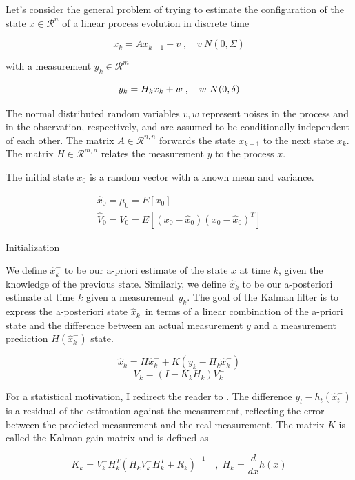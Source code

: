 \documentclass[mscthesis]{usiinfthesis}
\begin{document}
Let's consider the general problem of trying to estimate the configuration of the state $x \in \mathcal{R}^n$ of a linear process evolution in discrete time

\[
x_k = A x_{k-1} + v \; , \quad v ~ N(0, \Sigma)
\]

with a measurement $y_k \in \mathcal{R}^m$ 

\[
y_k = H_k x_k + w \; , \quad w  ~ N(0, \delta) \\
\]

The normal distributed random variables $v, w$ represent noises in the process and in the observation, respectively, and are assumed to be conditionally independent of each other. The matrix $A \in \mathcal{R}^{n, n}$ forwards the state $x_{k-1}$ to the next state $x_k$. The matrix $H \in \mathcal{R}^{m,n}$ relates the measurement $y$ to the process $x$.

The initial state $x_0$ is a random vector with a known mean and variance.

\begin{eqfloat}
\begin{equation}
\begin{array}{l}
\hat{x}_0 = \mu_0 = E[x_0] \\
\hat{V}_0 = V_0 = E[(x_0-\hat{x}_0)(x_0-\hat{x}_0)^T] 
\end{array}
\label{eq:linear_kalman_init}
\end{equation}
\caption{Initialization}
\end{eqfloat}


We define $\hat{x}_k^-$ to be our a-priori estimate of the state $x$ at time $k$, given the knowledge of the previous state. Similarly, we define $\hat{x}_k$ to be our a-posteriori estimate at time $k$ given a measurement $y_k$. The goal of the Kalman filter is to express the a-posteriori state $\hat{x}_k^-$ in terms of a linear combination of the a-priori state and the difference between an actual measurement $y$ and a measurement prediction $H(\hat{x}_k^-)$ state. 


\[
\hat{x}_k = H\hat{x}_k^- + K (y_k - H_k \hat{x}_k^-)
\]
\[
V_k = (I-K_k H_k)V_k^-
\]


For a statistical motivation, I redirect the reader to \citet{paper:Maybeck79}. The difference $y_t - h_t(\hat{x}_t^-)$ is a residual of the estimation against the measurement, reflecting the error between the predicted measurement and the real measurement. The matrix $K$ is called the Kalman gain matrix and is defined as 


\[
K_k = V_k^- H^T_k (H_k V_k^- H^T_k + R_k)^{-1}  \quad , \; H_k = \frac{d}{dx} h(x)
\]
\end{document}
